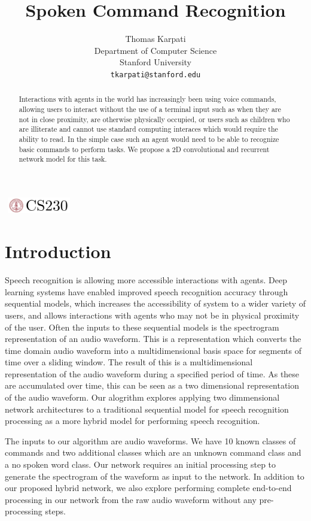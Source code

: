 \documentclass{article}
\title{Spoken Command Recognition}
\author{
  Thomas Karpati \\
  Department of Computer Science\\
  Stanford University\\
  \texttt{tkarpati@stanford.edu} \\
}
\begin{document}

\begin{center}
\includegraphics[width=3cm, height=0.7cm]{CS230}
\end{center}

\maketitle

\begin{abstract}
  Interactions with agents in the world has increasingly been using
  voice commands, allowing users to interact without the use of a
  terminal input such as when they are not in close proximity, are
  otherwise physically occupied, or users such as children who
  are illiterate and cannot use standard computing interaces which
  would require the ability to read. In the simple case such an agent
  would need to be able to recognize basic commands to perform
  tasks. We propose a 2D convolutional and recurrent network model for
  this task.
\end{abstract}

\section{Introduction}
Speech recognition is allowing more accessible interactions with
agents. Deep learning systems have enabled improved speech
recognition accuracy through sequential models, which increases the
accessibility of system to a wider variety of users, and allows
interactions with agents who may not be in physical proximity of the
user. Often the inputs to these sequential models is the spectrogram
representation of an audio waveform. This is a representation which
converts the time domain audio waveform into a multidimensional basis
space for segments of time over a sliding window. The result of this
is a multidimensional representation of the audio waveform during a
specified period of time. As these are accumulated over time, this can
be seen as a two dimensional representation of the audio waveform. Our
alogrithm explores applying two dimmensional network architectures to
a traditional sequential model for speech recognition processing as a
more hybrid model for performing speech recognition.

The inputs to our algorithm are audio waveforms. We have 10 known classes of
commands and two additional classes which are an unknown command class
and a no spoken word class. Our network requires an initial processing
step to generate the spectrogram of the waveform as input to the
network. In addition to our proposed hybrid network, we also explore
performing complete end-to-end processing in our network from the raw
audio waveform without any pre-processing steps. 
\end{document}
